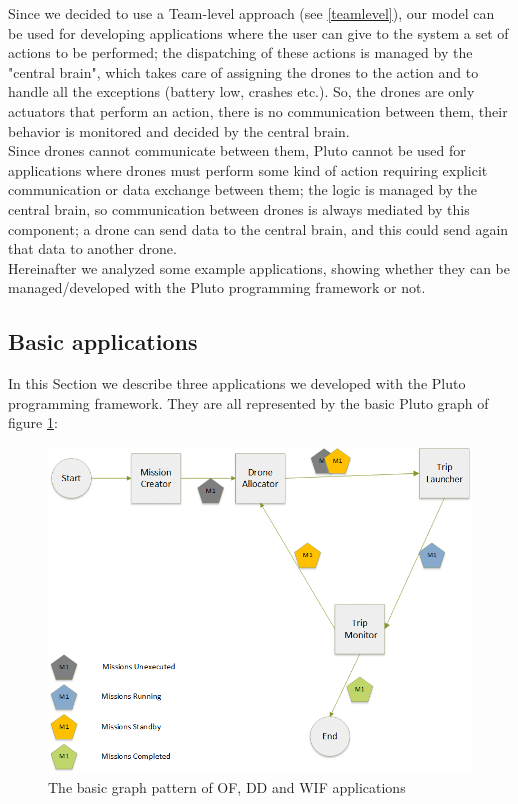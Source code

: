 Since we decided to use a Team-level approach (see \ref{teamlevel}), our model can be used for developing applications where the user can give to the system a set of actions to be performed; the dispatching of these actions is managed by the "central brain", which takes care of assigning the drones to the action and to handle all the exceptions (battery low, crashes etc.). So, the drones are only actuators that perform an action, there is no communication between them, their behavior is monitored and decided by the central brain.
\\

Since drones cannot communicate between them, Pluto cannot be used for applications where drones must perform some kind of action requiring explicit communication or data exchange between them; the logic is managed by the central brain, so communication between drones is always mediated by this component; a drone can send data to the central brain, and this could send again that data to another drone.
\\
Hereinafter we analyzed some  example applications, showing whether they can be managed/developed with the Pluto programming framework or not.
\\

\subsection{Basic applications}

In this Section we describe three applications we developed with the Pluto programming framework.
They are all represented by the basic Pluto graph of figure \ref{fig:basicGraph}:

\newpage

 \begin{figure}[h!]
   \centering
   \includegraphics[width=\linewidth]{pictures/BasicBlocksDiagram.png}
   \caption{The basic graph pattern of OF, DD and WIF applications}
   \label{fig:basicGraph}
 \end{figure}

